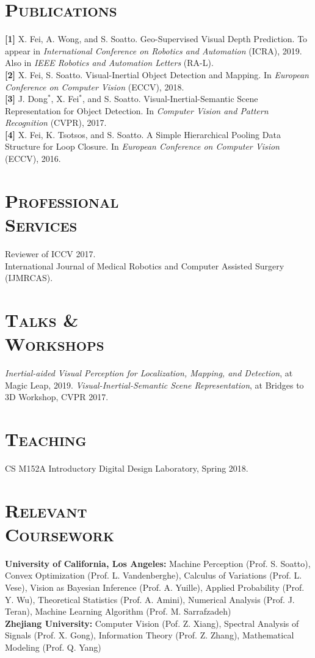 \documentclass[margin, line, 10pt]{res} %
\begin{document}
\begin{resume}
\section{\textsc{Publications}}

\textbf{[1]} X. Fei, A. Wong, and S. Soatto. Geo-Supervised Visual Depth Prediction. To appear in \textit{International Conference on Robotics and Automation} (ICRA), 2019. Also in \textit{IEEE Robotics and Automation Letters} (RA-L).\\
\textbf{[2]} X. Fei, S. Soatto. Visual-Inertial Object Detection and Mapping. In \textit{European Conference on Computer Vision} (ECCV), 2018.\\
\textbf{[3]} J. Dong$^*$, X. Fei$^*$, and S. Soatto. Visual-Inertial-Semantic Scene Representation for Object Detection. In \textit{Computer Vision and Pattern Recognition} (CVPR), 2017.\\
\textbf{[4]} X. Fei, K. Tsotsos, and S. Soatto. A Simple Hierarchical Pooling Data Structure for Loop Closure. In \textit{European Conference on Computer Vision} (ECCV), 2016.

\section{\textsc{Professional\\Services}}
Reviewer of ICCV 2017.\\
International Journal of Medical Robotics and Computer Assisted Surgery (IJMRCAS).

\section{\textsc{Talks \&\\Workshops}}
\textit{Inertial-aided Visual Perception for Localization, Mapping, and Detection}, at Magic Leap, 2019.
\textit{Visual-Inertial-Semantic Scene Representation}, at Bridges to 3D Workshop, CVPR 2017.

\section{\textsc{Teaching}}
CS M152A Introductory Digital Design Laboratory, Spring 2018.

\section{\textsc{Relevant\\Coursework}}
\textbf{University of California, Los Angeles:} Machine Perception (Prof. S. Soatto), Convex Optimization (Prof. L. Vandenberghe), Calculus of Variations (Prof. L. Vese), Vision as Bayesian Inference (Prof. A. Yuille), Applied Probability (Prof. Y. Wu), Theoretical Statistics (Prof. A. Amini), Numerical Analysis (Prof. J. Teran), Machine Learning Algorithm (Prof. M. Sarrafzadeh)\\
\textbf{Zhejiang University:} Computer Vision (Pof. Z. Xiang), Spectral Analysis of Signals (Prof. X. Gong), Information Theory (Prof. Z. Zhang), Mathematical Modeling (Prof. Q. Yang)


\end{resume}
\end{document}
